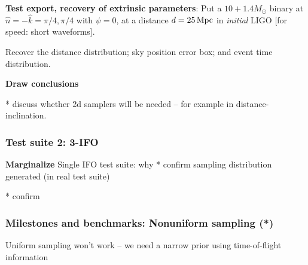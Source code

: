 \documentclass[twocolumn,prd,nofootinbib]{revtex4}
\newcommand\unit[1]{\, {\rm #1}}
\begin{document}
\begin{widetext}
\noindent \textbf{Test export, recovery of extrinsic parameters}: Put a $10+1.4 M_\odot$ binary  at
$\hat{n}=-\hat{k}=\pi/4,\pi/4$ with $\psi=0$, at a distance $d=25\unit{Mpc}$ in \emph{initial} LIGO [for speed: short
  waveforms].  

Recover the distance distribution;  sky position error box; and event time distribution.



\noindent \textbf{Draw conclusions}


* discuss whether 2d samplers will be needed -- for example in distance-inclination.

\subsubsection{Test suite 2: 3-IFO}




\noindent \textbf{Marginalize}
Single IFO test suite: why
* confirm sampling distribution generated (in real test suite)

* confirm 



\subsubsection{Milestones and benchmarks: Nonuniform sampling (*)} 
Uniform sampling won't work -- we need a narrow prior using time-of-flight information


\end{widetext}
\end{document}
